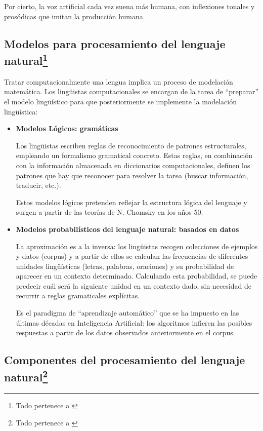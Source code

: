 \documentclass[runningheads]{llncs}
\begin{document}
Por cierto, la voz artificial cada vez suena más humana, con inflexiones tonales y prosódicas que imitan la producción humana.



\subsection{Modelos para procesamiento del lenguaje natural\protect\footnote{Todo pertenece a \cite{nlp}}}

Tratar computacionalmente una lengua implica un proceso de modelación matemática. Los lingüistas computacionales se encargan de la tarea de “preparar” el modelo lingüístico para que posteriormente se implemente la modelación lingüística:
\begin{itemize}


\item{\textbf{Modelos Lógicos: gramáticas}

Los lingüistas escriben reglas de reconocimiento de patrones estructurales, empleando un formalismo gramatical concreto. Estas reglas, en combinación con la información almacenada en diccionarios computacionales, definen los patrones que hay que reconocer para resolver la tarea (buscar información, traducir, etc.).

Estos modelos lógicos pretenden reflejar la estructura lógica del lenguaje y surgen a partir de las teorías de N. Chomsky en los años 50.} 


\item{\textbf{Modelos probabilísticos del lenguaje natural: basados en datos}

La aproximación es a la inversa: los lingüistas recogen colecciones de ejemplos y datos (corpus) y a partir de ellos se calculan las frecuencias de diferentes unidades lingüísticas (letras, palabras, oraciones) y su probabilidad de aparecer en un contexto determinado. Calculando esta probabilidad, se puede predecir cuál será la siguiente unidad en un contexto dado, sin necesidad de recurrir a reglas gramaticales explícitas.

Es el paradigma de “aprendizaje automático” que se ha impuesto en las últimas décadas en Inteligencia Artificial: los algoritmos infieren las posibles respuestas a partir de los datos observados anteriormente en el corpus.}
\end{itemize}

\subsection{Componentes del procesamiento del lenguaje natural\protect\footnote{Todo pertenece a \cite{nlp}}}
\end{document}
